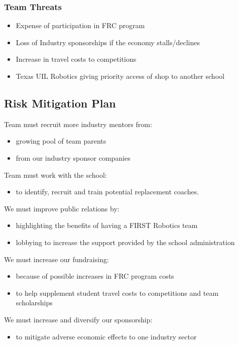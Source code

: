 \subsubsection{Team Threats}
\begin{itemize}
	\item Expense of participation in FRC program
	\item Loss of Industry sponsorships if the economy stalls/declines 
	\item Increase in travel costs to competitions
	\item Texas UIL Robotics giving priority access of shop to another school
\end{itemize}

\subsection{Risk Mitigation Plan}
Team must recruit more industry mentors from:
\begin{itemize}
	\item growing pool of team parents
	\item from our industry sponsor companies
\end{itemize}

Team must work with the school:
\begin{itemize}
	\item to identify, recruit and train potential replacement coaches.
\end{itemize}

We must improve public relations by:
\begin{itemize}
	\item highlighting the benefits of having a FIRST Robotics team
	\item lobbying to increase the support provided by the school administration
\end{itemize}

We must increase our fundraising:
\begin{itemize}
	\item because of possible increases in FRC program costs
	\item to help supplement student travel costs to competitions and team scholarships
\end{itemize}

We must increase and diversify our sponsorship:
\begin{itemize}
	\item to mitigate adverse economic effects to one industry sector 
\end{itemize}

